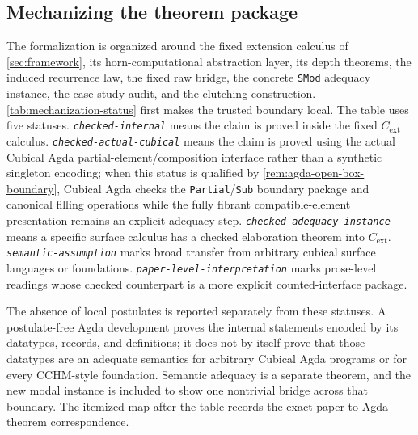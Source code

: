 \documentclass{lmcs}
\newcommand{\Cext}{C_{\mathrm{ext}}}
\begin{document}
\subsection{Mechanizing the theorem package}

The formalization is organized around the fixed extension calculus of \autoref{sec:framework}, its horn-computational abstraction layer, its depth theorems, the induced recurrence law, the fixed raw bridge, the concrete \texttt{SMod} adequacy instance, the case-study audit, and the clutching construction. \autoref{tab:mechanization-status} first makes the trusted boundary local. The table uses five statuses. \emph{\texttt{checked-internal}} means the claim is proved inside the fixed \(\Cext\) calculus. \emph{\texttt{checked-actual-cubical}} means the claim is proved using the actual Cubical Agda partial-element/composition interface rather than a synthetic singleton encoding; when this status is qualified by \autoref{rem:agda-open-box-boundary}, Cubical Agda checks the \texttt{Partial}/\texttt{Sub} boundary package and canonical filling operations while the fully fibrant compatible-element presentation remains an explicit adequacy step. \emph{\texttt{checked-adequacy-instance}} means a specific surface calculus has a checked elaboration theorem into \(\Cext\). \emph{\texttt{semantic-assumption}} marks broad transfer from arbitrary cubical surface languages or foundations. \emph{\texttt{paper-level-interpretation}} marks prose-level readings whose checked counterpart is a more explicit counted-interface package.

The absence of local postulates is reported separately from these statuses. A postulate-free Agda development proves the internal statements encoded by its datatypes, records, and definitions; it does not by itself prove that those datatypes are an adequate semantics for arbitrary Cubical Agda programs or for every CCHM-style foundation. Semantic adequacy is a separate theorem, and the new modal instance is included to show one nontrivial bridge across that boundary. The itemized map after the table records the exact paper-to-Agda theorem correspondence.
\end{document}
